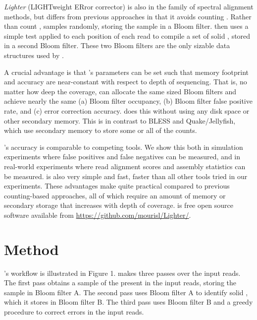 \documentclass{bmcart}
\begin{document}
\emph{Lighter} (LIGHTweight ERror corrector) is also in the family of spectral alignment methods, but differs from previous approaches in that it avoids counting \kmers.
Rather than count \kmers, \tool samples \kmers randomly, storing the sample in a Bloom filter.
\tool then uses a simple test applied to each position of each read to compile a set of solid \kmers, stored in a second Bloom filter.
These two Bloom filters are the only sizable data structures used by \tool.

A crucial advantage is that \tool's parameters can be set such that memory footprint and accuracy are near-constant with respect to depth of sequencing.
That is, no matter how deep the coverage, \tool can allocate the same sized Bloom filters and achieve nearly the same (a) Bloom filter occupancy, (b) Bloom filter false positive rate, and (c) error correction accuracy.
\tool does this without using any disk space or other secondary memory.
This is in contrast to BLESS and Quake/Jellyfish, which use secondary memory to store some or all of the \kmer counts.

\tool's accuracy is comparable to competing tools.  We show this both in simulation experiments where false positives and false negatives can be measured, and in real-world experiments where read alignment scores and assembly statistics can be measured.  
\tool is also very simple and fast, faster than all other tools tried in our experiments.
These advantages make \tool quite practical compared to previous counting-based approaches, all of which require an amount of memory or secondary storage that increases with depth of coverage.
\tool is free open source software available from \url{https://github.com/mourisl/Lighter/}.

\section*{Method}
\tool's workflow is illustrated in Figure 1. \tool makes three passes over the input reads.  The first pass obtains a sample of the \kmers present in the input reads, storing the sample in Bloom filter A.  The second pass uses Bloom filter A to identify solid \kmers, which it stores in Bloom filter B.  The third pass uses Bloom filter B and a greedy procedure to correct errors in the input reads.
\end{document}
